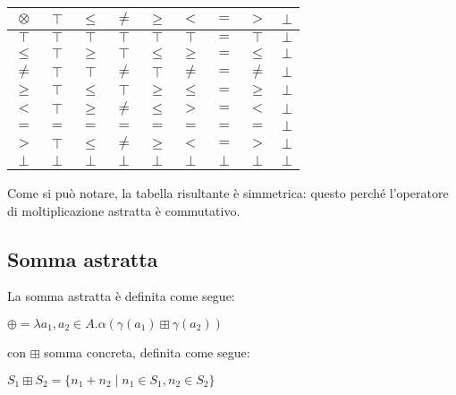\documentclass[a4paper, 12pt, oneside,fleqn]{book}
\begin{document}
\begin{center}
	\begin{tabular}{| c | c | c | c | c | c | c | c | c | }
		\hline
		$\otimes$ & $\top$ & $\leq$ & $\neq$ & $\geq$ & $<$ & $=$ & $>$ & $\bot$ \\
		\hline
		$\top$ & $\top$ & $\top$ & $\top$ & $\top$ & $\top$ & $=$ & $\top$ & $\bot$  \\
		\hline
		$\leq$ & $\top$ & $\geq$ & $\top$ & $\leq$ & $\geq$ & $=$ & $\leq$ & $\bot$\\
		\hline
		$\neq$ & $\top$ & $\top$ & $\neq$ & $\top$ & $\neq$ & $=$ & $\neq$ & $\bot$ \\
		\hline
		$\geq$ & $\top$ & $\leq$ & $\top$ & $\geq$ & $\leq$ & $=$ & $\geq$ & $\bot$ \\
		\hline
		$<$ & $\top$ & $\geq$ & $\neq$ & $\leq$ & $>$ & $=$ & $<$ & $\bot$ \\
		\hline
		$=$ & $=$ & $=$ & $=$ & $=$ & $=$ & $=$ & $=$ & $\bot$\\
		\hline
		$>$ & $\top$ & $\leq$ & $\neq$ & $\geq$ & $<$ & $=$ & $>$ & $\bot$\\
		\hline
		$\bot$ & $\bot$ & $\bot$ & $\bot$ & $\bot$ & $\bot$ & $\bot$ & $\bot$ & $\bot$ \\
		\hline
	\end{tabular}
\end{center}

Come si può notare, la tabella risultante è simmetrica: questo perché l'operatore di moltiplicazione astratta è commutativo.

\subsection{Somma astratta}

La somma astratta è definita come segue:

\begin{center}
	$ \oplus = \lambda a_1,a_2 \in A . \alpha(\gamma(a_1) \boxplus \gamma(a_2)) $
\end{center}
con $\boxplus$ somma concreta, definita come segue:

\begin{center}
	$ S_1 \boxplus S_2 = \{ n_1 + n_2 \mid n_1 \in S_1, n_2 \in S_2 \} $
\end{center}
\end{document}
